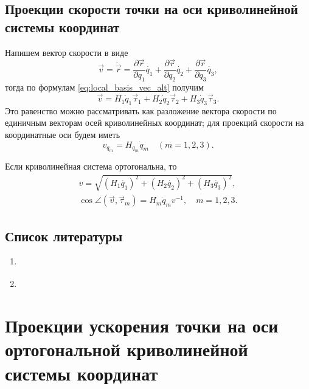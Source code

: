 \documentclass{article}
\theoremstyle{definition}
\theoremstyle{plain}
\theoremstyle{remark}
\numberwithin{equation}{section}
\newcommand{\paren}[1]{\left( #1 \right)}
\newcommand{\parder}[2][]{\frac{\partial #1}{\partial #2}}
\begin{document}
\subsection{Проекции скорости точки на оси криволинейной системы координат}

Напишем вектор скорости в виде
\begin{equation}
  \label{eq:velocity_def}
  \vec{v} = \dot{\vec{r}} = \parder[\vec{r}]{q_1} \dot{q_1} +
  \parder[\vec{r}]{q_2} \dot{q_2} + \parder[\vec{r}]{q_3} \dot{q_3},
\end{equation}
тогда по формулам \ref{eq:local_basis_vec_alt} получим
\begin{equation*}
  \vec{v} = H_1 \dot{q}_1 \vec{\tau}_1 + H_2 \dot{q}_2 \vec{\tau}_2 + H_3
  \dot{q}_3 \vec{\tau}_3.
\end{equation*}
Это равенство можно рассматривать как разложение вектора скорости по единичным
векторам осей криволинейных координат; для проекций скорости на координатные
оси будем иметь
\begin{equation}
  \label{eq:velocity_proj}
  v_{q_m} = H_{q_m} \dot{q}_m \quad (m = 1,2,3).
\end{equation}

Если криволинейная система ортогональна, то
\begin{equation}
  \begin{gathered}
    v = \sqrt{\paren{H_1 \dot{q_1}}^2 + \paren{H_2 \dot{q_2}}^2 + \paren{H_3
      \dot{q_3}}^2}, \\
    \cos\angle (\vec{v}, \vec{\tau}_m) = H_m \dot{q}_m v^{-1}, \quad m = 1,2,3.
  \end{gathered}
\end{equation}

\subsection{Список литературы}
\begin{enumerate}
  \item \cite{lectures}
  \item \cite{lourie}
\end{enumerate}

\pagebreak


\section{Проекции ускорения точки на оси ортогональной криволинейной системы
координат}
\end{document}
